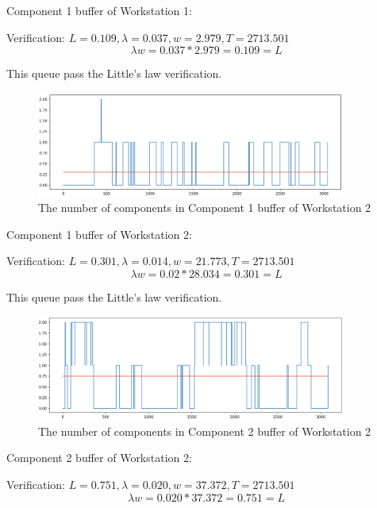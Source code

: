 \documentclass{article}
\begin{document}
Component 1 buffer of Workstation 1:

Verification: $L = 0.109, \lambda = 0.037, w = 2.979, T = 2713.501$
\begin{equation}
\lambda w = 0.037*2.979 = 0.109 = L
\end{equation}

This queue pass the Little's law verification.

\begin{figure}[htbp]
\begin{center}
\includegraphics[width=4in]{W2_C1B.png}
\caption{The number of components in Component 1 buffer of Workstation 2}
\label{W2_C1B}
\end{center}
\end{figure}

Component 1 buffer of Workstation 2:

Verification: $L = 0.301, \lambda = 0.014, w = 21.773, T = 2713.501$
\begin{equation}
\lambda w = 0.02*28.034 = 0.301 = L
\end{equation}

This queue pass the Little's law verification.

\begin{figure}[htbp]
\begin{center}
\includegraphics[width=4in]{W2_C2B.png}
\caption{The number of components in Component 2 buffer of Workstation 2}
\label{W2_C2B}
\end{center}
\end{figure}

Component 2 buffer of Workstation 2:

Verification: $L = 0.751, \lambda = 0.020, w = 37.372, T = 2713.501$
\begin{equation}
\lambda w = 0.020*37.372 = 0.751 = L
\end{equation}
\end{document}
